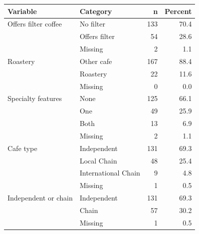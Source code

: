 \begin{tabular}{llrr}
\toprule
Variable & Category & n & Percent \\
\midrule
Offers filter coffee & No filter & 133 & 70.4 \\
 & Offers filter &  54 & 28.6 \\
 & Missing &   2 & 1.1 \\
Roastery & Other cafe & 167 & 88.4 \\
 & Roastery &  22 & 11.6 \\
 & Missing &   0 & 0.0 \\
Specialty features & None & 125 & 66.1 \\
 & One &  49 & 25.9 \\
 & Both &  13 & 6.9 \\
 & Missing &   2 & 1.1 \\
Cafe type & Independent & 131 & 69.3 \\
 & Local Chain &  48 & 25.4 \\
 & International Chain &   9 & 4.8 \\
 & Missing &   1 & 0.5 \\
Independent or chain & Independent & 131 & 69.3 \\
 & Chain &  57 & 30.2 \\
 & Missing &   1 & 0.5 \\
\bottomrule
\end{tabular}
